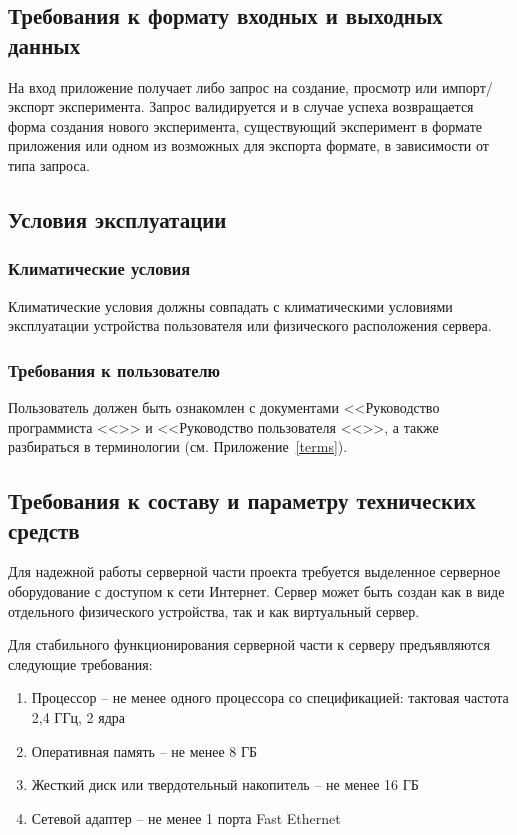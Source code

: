 \documentclass[a4paper,12pt,reqno]{article}
\begin{document}
    \subsection{Требования к формату входных и выходных данных}
    На вход приложение получает либо запрос на создание, просмотр или импорт/экспорт эксперимента. Запрос валидируется и в случае успеха возвращается форма создания нового эксперимента, существующий эксперимент в формате приложения или одном из возможных для экспорта формате, в зависимости от типа запроса.

    \subsection{Условия эксплуатации}

    \subsubsection{Климатические условия}
    Климатические условия должны совпадать с климатическими условиями эксплуатации устройства пользователя или физического расположения сервера.

    \subsubsection{Требования к пользователю}
    Пользователь должен быть ознакомлен с документами <<Руководство программиста  <<\unskip>> и <<Руководство пользователя <<\unskip>>, а также разбираться в терминологии (см. Приложение~\ref{terms}).

    \subsection{Требования к составу и параметру технических средств}
    Для надежной работы серверной части проекта требуется выделенное серверное оборудование с доступом к сети Интернет. Сервер может быть создан как в виде отдельного физического устройства, так и как виртуальный сервер.

    Для стабильного функционирования серверной части к серверу предъявляются следующие требования:
    \begin{enumerate}
        \item Процессор – не менее одного процессора со спецификацией: тактовая частота 2,4 ГГц, 2 ядра
        \item Оперативная память – не менее 8 ГБ
        \item Жесткий диск или твердотельный накопитель – не менее 16 ГБ
        \item Сетевой адаптер – не менее 1 порта Fast Ethernet
    \end{enumerate}
\end{document}
